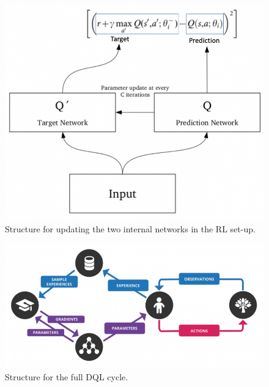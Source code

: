 \documentclass[runningheads,envcountsect]{llncs}
\begin{document}
\begin{figure}[t]
  \centering
  \includegraphics[scale=0.5]{img/rl_double_model.png}
  \caption{Structure for updating the two internal networks in the RL set-up.}
  \label{fig:rl_dm}
\end{figure}

\begin{figure}[t]
  \centering
  \includegraphics[scale=0.6]{img/dql_full.png}
  \caption{Structure for the full DQL cycle.}
  \label{fig:dql_full}
\end{figure}
\end{document}
